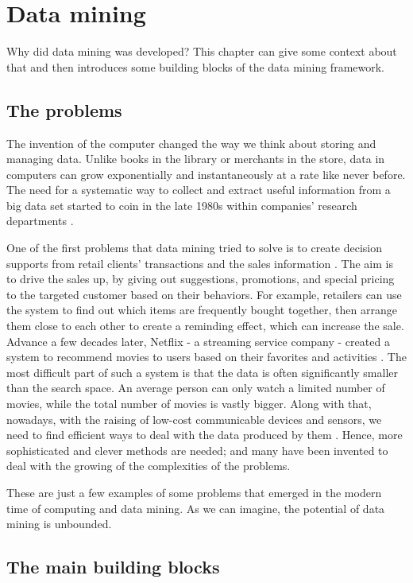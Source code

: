 \section{Data mining}
\label{sec:datamining}
Why did data mining was developed?
This chapter can give some context about that and then introduces some building blocks of the data mining framework.
\subsection{The problems}
\label{sub:the_problems}
The invention of the computer changed the way we think about storing and managing data.
Unlike books in the library or merchants in the store, data in computers can grow exponentially and instantaneously at a rate like never before.
The need for a systematic way to collect and extract useful information from a big data set started to coin in the late 1980s within companies' research departments \citep{coenen_datamining_2011}.

One of the first problems that data mining tried to solve is to create decision supports from retail clients' transactions and the sales information \citep{coenen_datamining_2011}.
The aim is to drive the sales up, by giving out suggestions, promotions, and special pricing to the targeted customer based on their behaviors.
For example, retailers can use the system to find out which items are frequently bought together, then arrange them close to each other to create a reminding effect, which can increase the sale.
Advance a few decades later, Netflix - a streaming service company - created a system to recommend movies to users based on their favorites and activities \citep{netflix_rs_2016}.
The most difficult part of such a system is that the data is often significantly smaller than the search space.
An average person can only watch a limited number of movies, while the total number of movies is vastly bigger.
Along with that, nowadays, with the raising of low-cost communicable devices and sensors, we need to find efficient ways to deal with the data produced by them \citep{data_mining_iot_2014}.
Hence, more sophisticated and clever methods are needed; and many have been invented to deal with the growing of the complexities of the problems.

These are just a few examples of some problems that emerged in the modern time of computing and data mining.
As we can imagine, the potential of data mining is unbounded.

\subsection{The main building blocks}
\label{sub:building_blocks}

